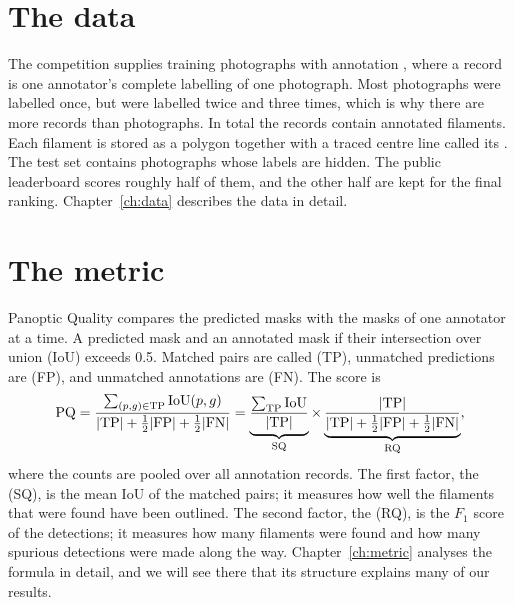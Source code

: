 \section{The data}\label{sec:intro-data}
The competition supplies \AllPhotos{} training photographs with \AllRecords{} annotation
, where a record is one annotator's complete labelling of one photograph. Most
photographs were labelled once, but \TwiceAnnotated{} were labelled twice and \ThriceAnnotated{}
three times, which is why there are more records than photographs. In total the records contain
\AllFilaments{} annotated filaments. Each filament is stored as a polygon together with a traced
centre line called its . The test set contains \TestPhotos{} photographs whose
labels are hidden. The public leaderboard scores roughly half of them, and the other half are
kept for the final ranking. Chapter~\ref{ch:data} describes the data in detail.

\section{The metric}\label{sec:intro-metric}
Panoptic Quality compares the predicted masks with the masks of one annotator at a time. A
predicted mask and an annotated mask  if their intersection over union (IoU)
exceeds 0.5. Matched pairs are called  (TP), unmatched predictions are
 (FP), and unmatched annotations are  (FN).
The score is
\begin{equation}
\mathrm{PQ} = \frac{\sum_{(p,g)\in\mathrm{TP}}\mathrm{IoU}(p,g)}{|\mathrm{TP}| + \tfrac12|\mathrm{FP}| + \tfrac12|\mathrm{FN}|}
    = \underbrace{\frac{\sum_{\mathrm{TP}}\mathrm{IoU}}{|\mathrm{TP}|}}_{\mathrm{SQ}}\times
      \underbrace{\frac{|\mathrm{TP}|}{|\mathrm{TP}| + \tfrac12|\mathrm{FP}| + \tfrac12|\mathrm{FN}|}}_{\mathrm{RQ}},
\label{eq:intro-pq}
\end{equation}
where the counts are pooled over all annotation records. The first factor, the
 (SQ), is the mean IoU of the matched pairs; it measures how well
the filaments that were found have been outlined. The second factor, the  (RQ), is the $F_1$ score of the detections; it measures how many filaments were found and
how many spurious detections were made along the way. Chapter~\ref{ch:metric} analyses the
formula in detail, and we will see there that its structure explains many of our results.

